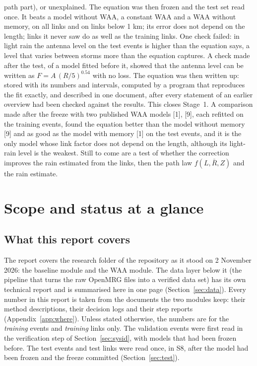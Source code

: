 \documentclass[11pt,a4paper]{article}
\newcommand{\Rbar}{\bar{R}}
\begin{document}
path part), or unexplained. The equation was then frozen and the test set read once. It beats a model without WAA, a
constant WAA and a WAA without memory, on all links and on links below 1 km; its error does not depend on the length;
links it never saw do as well as the training links. One check failed: in light rain the antenna level on the test
events is higher than the equation says, a level that varies between storms more than the equation captures. A
check made after the test, of a model fitted before it, showed that the antenna level can be written as
$F = A\,(R/5)^{0.54}$ with no loss. The equation was then written up: stored with its numbers and intervals, computed by
a program that reproduces the fit exactly, and described in one document, after every statement of an
earlier overview had been checked against the results. This closes Stage~1. A comparison made after the freeze with
two published WAA models [1], [9], each refitted on the training events, found the equation better than the model
without memory [9] and as good as the model with memory [1] on the test events, and it is the only model whose link
factor does not depend on the length, although its light-rain level is the weakest. Still to come are a test of whether the
correction improves the rain estimated from the links, then the path law $f(L,\Rbar,Z)$ and the rain estimate.

\enlargethispage{2\baselineskip}
\tableofcontents
\newpage

\section{Scope and status at a glance}

\subsection{What this report covers}

The report covers the research folder of the repository as it stood on 2 November 2026: the baseline module and the
WAA module. The data layer below it (the pipeline that turns the raw OpenMRG files into a verified data set) has its
own technical report and is summarised here in one page (Section~\ref{sec:data}). Every number in this report is
taken from the documents the two modules keep: their method descriptions, their decision logs and their step reports
(Appendix~\ref{app:where}). Unless stated otherwise, the numbers are for the \emph{training} events and
\emph{training} links only. The validation events were first read in the verification step of
Section~\ref{sec:sysid}, with models that had been frozen before. The test events and test links were read once, in
S8, after the model had been frozen and the freeze committed (Section~\ref{sec:test}).
\end{document}
